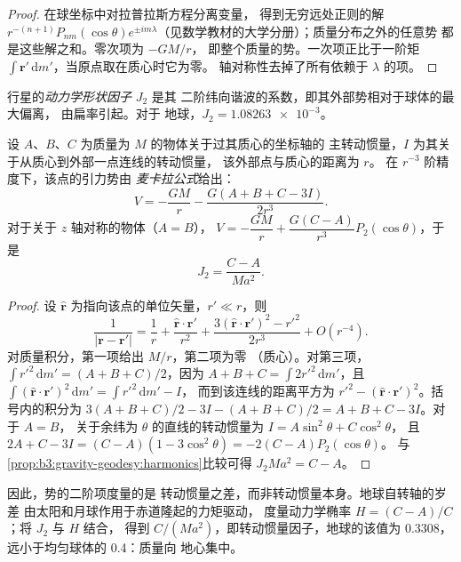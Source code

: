 \begin{proof}
在球坐标中对拉普拉斯方程分离变量，
得到无穷远处正则的解 $r^{-(n+1)}P_{nm}(\cos\theta)e^{\pm
im\lambda}$（见数学教材的大学分册）；质量分布之外的任意势
都是这些解之和。零次项为 $-GM/r$，
即整个质量的势。一次项正比于一阶矩
$\int\mathbf r'\,\mathrm dm'$，当原点取在质心时它为零。
轴对称性去掉了所有依赖于 $\lambda$ 的项。
\end{proof}

\begin{definition}[动力学形状因子]\label{def:b3:gravity-geodesy:j2}
行星的\emph{动力学形状因子} $J_2$ 是其
二阶纬向谐波的系数，即其外部势相对于球体的最大偏离，
由扁率引起。对于
地球，$J_2 = \num{1.08263e-3}$。
\end{definition}

\begin{theorem}[麦卡拉公式]\label{thm:b3:gravity-geodesy:maccullagh}
设 $A$、$B$、$C$ 为质量为 $M$ 的物体关于过其质心的坐标轴的
主转动惯量，$I$ 为其关于从质心到外部一点连线的转动惯量，
该外部点与质心的距离为 $r$。
在 $r^{-3}$ 阶精度下，该点的引力势由
\emph{麦卡拉公式}给出：
\[
  V = -\frac{GM}{r} - \frac{G(A + B + C - 3I)}{2r^3} .
\]
对于关于 $z$ 轴对称的物体（$A = B$），
$V = -\dfrac{GM}{r} + \dfrac{G(C - A)}{r^3}P_2(\cos\theta)$，于是
\[
  J_2 = \frac{C - A}{Ma^2} .
\]
\end{theorem}

\begin{proof}
设 $\hat{\mathbf r}$ 为指向该点的单位矢量，$r' \ll r$，则
\[
  \frac{1}{|\mathbf r - \mathbf r'|} = \frac1r + \frac{\hat{\mathbf r}\cdot\mathbf r'}{r^2}
  + \frac{3(\hat{\mathbf r}\cdot\mathbf r')^2 - r'^2}{2r^3} + O(r^{-4}).
\]
对质量积分，第一项给出 $M/r$，第二项为零
（质心）。对第三项，$\int r'^2\,\mathrm dm' = (A + B + C)/2$，因为
$A + B + C = \int 2r'^2\,\mathrm dm'$，且 $\int(\hat{\mathbf r}\cdot\mathbf
r')^2\,\mathrm dm' = \int r'^2\,\mathrm dm' - I$，
而到该连线的距离平方为 $r'^2 - (\hat{\mathbf r}\cdot\mathbf r')^2$。括号内的积分为
$3(A + B + C)/2 - 3I - (A + B + C)/2 = A + B + C - 3I$。对于 $A = B$，
关于余纬为 $\theta$ 的直线的转动惯量为 $I = A\sin^2\theta + C\cos^2\theta$，
且 $2A + C - 3I = (C - A)(1 - 3\cos^2\theta) = -2(C - A)P_2(\cos\theta)$。
与\cref{prop:b3:gravity-geodesy:harmonics}比较可得
$J_2Ma^2 = C - A$。
\end{proof}

因此，势的二阶项度量的是
转动惯量之差，而非转动惯量本身。地球自转轴的岁差
由太阳和月球作用于赤道隆起的力矩驱动，
度量动力学椭率 $H = (C - A)/C$；将 $J_2$ 与 $H$ 结合，
得到 $C/(Ma^2)$，即转动惯量因子，地球的该值为 \num{0.3308}，
远小于均匀球体的 \num{0.4}：质量向
地心集中。

